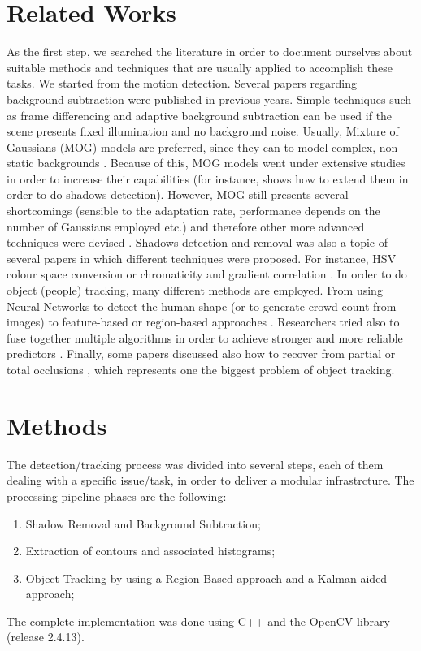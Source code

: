 \documentclass[runningheads]{llncs}
\begin{document}
\section{Related Works}
As the first step, we searched the literature in order to document ourselves about suitable methods and techniques that are usually applied to accomplish these tasks. We started from the motion detection.
Several papers regarding background subtraction were published in previous years. Simple techniques such as frame differencing and adaptive background subtraction can be used if the scene presents fixed illumination and no background noise. Usually, Mixture of Gaussians (MOG) models are preferred, since they can to model complex, non-static backgrounds \cite{mog}. Because of this, MOG models went under extensive studies in order to increase their capabilities (for instance, \cite{mog_improved} shows how to extend them in order to do shadows detection). However, MOG still presents several shortcomings (sensible to the adaptation rate, performance depends on the number of Gaussians employed etc.) and therefore other more advanced techniques were devised \cite{bg_codebook, bg_fuzzy, van2014vibe}. Shadows detection and removal was also a topic of several papers in which different techniques were proposed. For instance, HSV colour space conversion \cite{cucchiara2001detecting} or chromaticity and gradient correlation \cite{sanin2010detecting}.  
In order to do object (people) tracking, many different methods are employed. From using Neural Networks to detect the human shape (or to generate crowd count from images)\cite{tang2017multiple, zhang2016single} to feature-based or region-based approaches \cite{5597093}. Researchers tried also to fuse together multiple algorithms in order to achieve stronger and more reliable predictors \cite{10.1007/3-540-47979-1_25}. Finally, some papers discussed also how to recover from partial or total occlusions \cite{LERDSUDWICHAI20051059}, which represents one the biggest problem of object tracking.

\section{Methods}

The detection/tracking process was divided into several steps, each of them dealing with a specific issue/task, in order to deliver a modular infrastrcture. The processing pipeline phases are the following:
\begin{enumerate}
\item Shadow Removal and Background Subtraction;
\item Extraction of contours and associated histograms;
\item Object Tracking by using a Region-Based approach and a Kalman-aided approach;
\end{enumerate}
The complete implementation was done using C++ and the OpenCV library (release 2.4.13)\cite{itseez2015opencv}.
\end{document}
